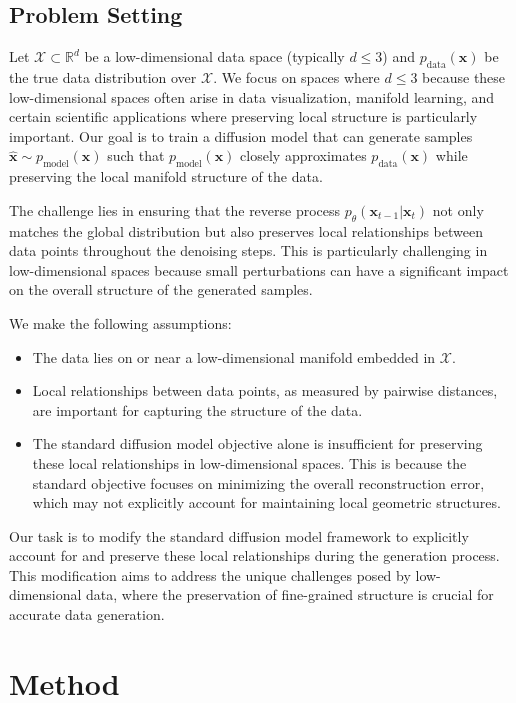 \documentclass{article} %
\begin{document}
\subsection{Problem Setting}
Let $\mathcal{X} \subset \mathbb{R}^d$ be a low-dimensional data space (typically $d \leq 3$) and $p_\text{data}(\mathbf{x})$ be the true data distribution over $\mathcal{X}$. We focus on spaces where $d \leq 3$ because these low-dimensional spaces often arise in data visualization, manifold learning, and certain scientific applications where preserving local structure is particularly important. Our goal is to train a diffusion model that can generate samples $\hat{\mathbf{x}} \sim p_\text{model}(\mathbf{x})$ such that $p_\text{model}(\mathbf{x})$ closely approximates $p_\text{data}(\mathbf{x})$ while preserving the local manifold structure of the data.

The challenge lies in ensuring that the reverse process $p_\theta(\mathbf{x}_{t-1} | \mathbf{x}_t)$ not only matches the global distribution but also preserves local relationships between data points throughout the denoising steps. This is particularly challenging in low-dimensional spaces because small perturbations can have a significant impact on the overall structure of the generated samples.

We make the following assumptions:
\begin{itemize}
    \item The data lies on or near a low-dimensional manifold embedded in $\mathcal{X}$.
    \item Local relationships between data points, as measured by pairwise distances, are important for capturing the structure of the data.
    \item The standard diffusion model objective alone is insufficient for preserving these local relationships in low-dimensional spaces. This is because the standard objective focuses on minimizing the overall reconstruction error, which may not explicitly account for maintaining local geometric structures.
\end{itemize}

Our task is to modify the standard diffusion model framework to explicitly account for and preserve these local relationships during the generation process. This modification aims to address the unique challenges posed by low-dimensional data, where the preservation of fine-grained structure is crucial for accurate data generation.

\section{Method}
\label{sec:method}
\end{document}
